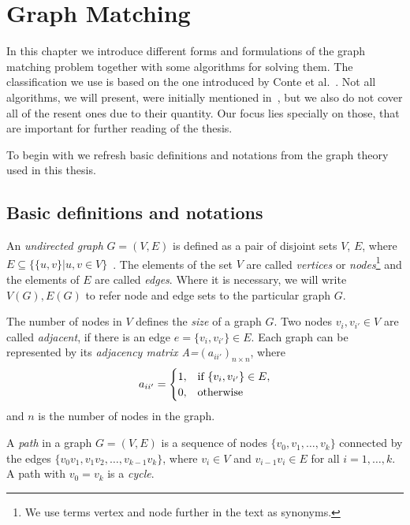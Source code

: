 
\chapter{Graph Matching} \label{chapter:GM}
In this chapter we introduce different forms and formulations of the graph matching problem together with some algorithms for solving them.
The classification we use is based on the one introduced by Conte et al.~\cite{Conte2004}. Not all algorithms, we will present, were initially mentioned in~\cite{Conte2004}, but we also do not cover all of the resent ones due to their quantity. Our focus lies specially on those, that are important for further reading of the thesis.

To begin with we refresh basic definitions and notations from the graph theory used in this thesis.
\section{Basic definitions and notations}
An \emph{undirected graph} $G=(V,E)$ is defined as a pair of disjoint sets $V$, $E$, where $E\subseteq\{\{u,v\}| u, v\in V\}$~\cite{Diestel2000}. The elements of the set $V$ are called \emph{vertices} or \emph{nodes}\footnote{We use terms vertex and node further in the text as synonyms.} and the elements of $E$ are called \emph{edges}. Where it is necessary, we will write $V(G), E(G)$ to refer node and edge sets to the particular graph $G$.

The number of nodes in $V$ defines the \emph{size} of a graph $G$.
Two nodes $v_{i},v_{i'}\in V$ are called \emph{adjacent}, if there is an edge $e=\{v_{i},v_{i'}\}\in E$. Each graph can be represented by its \emph{adjacency matrix A=$(a_{ii'})_{n\times n}$}, where 
\begin{equation*}\centering
a_{ii'}=\begin{cases}
 1, & \text{if } \{v_{i},v_{i'}\}\in E, \\
 0, & \text{otherwise} \\
\end{cases}
\end{equation*}
and $n$ is the number of nodes in the graph.

A \emph{path} in a graph $G=(V,E)$ is a sequence of nodes $\{v_0,v_1,\dots,v_k\}$ connected by the edges $\{v_0v_1,v_1v_2,\dots,v_{k-1}v_k\}$, where $v_i\in V$ and $v_{i-1}v_i\in E$ for all $i=1,\dots,k$. A path with $v_0=v_k$ is a \emph{cycle}.

